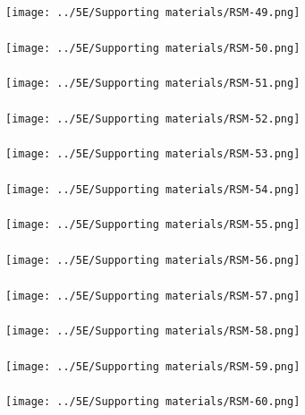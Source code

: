\begin{frame}\frametitle{}
	\centerline{\texttt{[image: ../5E/Supporting materials/RSM-49.png]}}
\end{frame}
\begin{frame}\frametitle{}
	\centerline{\texttt{[image: ../5E/Supporting materials/RSM-50.png]}}
\end{frame}
\begin{frame}\frametitle{}
	\centerline{\texttt{[image: ../5E/Supporting materials/RSM-51.png]}}
\end{frame}
\begin{frame}\frametitle{}
	\centerline{\texttt{[image: ../5E/Supporting materials/RSM-52.png]}}
\end{frame}
\begin{frame}\frametitle{}
	\centerline{\texttt{[image: ../5E/Supporting materials/RSM-53.png]}}
\end{frame}
\begin{frame}\frametitle{}
	\centerline{\texttt{[image: ../5E/Supporting materials/RSM-54.png]}}
\end{frame}
\begin{frame}\frametitle{}
	\centerline{\texttt{[image: ../5E/Supporting materials/RSM-55.png]}}
\end{frame}
\begin{frame}\frametitle{}
	\centerline{\texttt{[image: ../5E/Supporting materials/RSM-56.png]}}
\end{frame}
\begin{frame}\frametitle{}
	\centerline{\texttt{[image: ../5E/Supporting materials/RSM-57.png]}}
\end{frame}
\begin{frame}\frametitle{}
	\centerline{\texttt{[image: ../5E/Supporting materials/RSM-58.png]}}
\end{frame}
\begin{frame}\frametitle{}
	\centerline{\texttt{[image: ../5E/Supporting materials/RSM-59.png]}}
\end{frame}
\begin{frame}\frametitle{}
	\centerline{\texttt{[image: ../5E/Supporting materials/RSM-60.png]}}
\end{frame}
